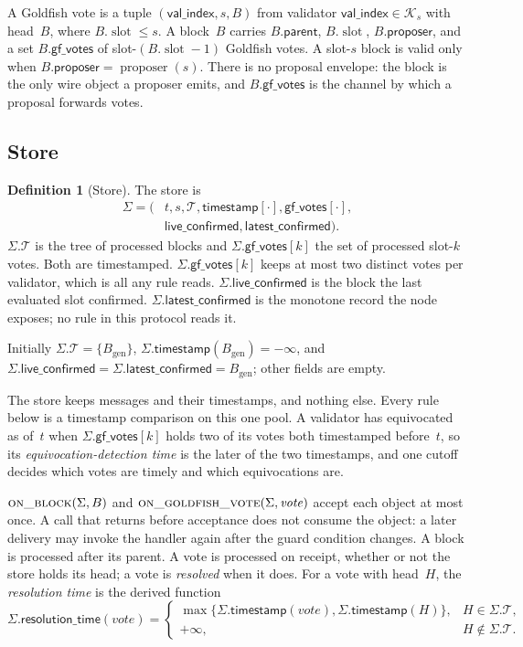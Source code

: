 \documentclass{article}
\theoremstyle{plain}
\theoremstyle{definition}
\newtheorem{definition}{Definition}
\theoremstyle{remark}
\newcommand{\genesis}{B_{\mathrm{gen}}}
\newcommand{\slot}{\operatorname{slot}}
\newcommand{\parent}{\mathsf{parent}}
\newcommand{\proposer}{\mathsf{proposer}}
\newcommand{\valindex}{\mathsf{val\_index}}
\newcommand{\committee}{\mathcal K}
\newcommand{\T}{\mathcal T}
\newcommand{\gfPool}{\mathsf{gf\_votes}}
\newcommand{\liveConfirmed}{\mathsf{live\_confirmed}}
\newcommand{\latestConfirmed}{\mathsf{latest\_confirmed}}
\newcommand{\timestamp}{\mathsf{timestamp}}
\newcommand{\resolutionTime}{\mathsf{resolution\_time}}
\begin{document}
A Goldfish vote is a tuple $(\valindex,s,B)$ from validator
$\valindex\in\committee_s$ with
head~$B$, where $B.\slot\leq s$.  A block~$B$ carries $B.\parent$,
$B.\slot$, $B.\proposer$, and a set $B.\gfPool$ of slot-$(B.\slot-1)$
Goldfish votes.  A slot-$s$ block is valid only when
$B.\proposer=\operatorname{proposer}(s)$.  There is no proposal envelope:
the block is the only wire object a proposer emits, and $B.\gfPool$ is the
channel by which a proposal forwards votes.

\subsection{Store}\label{sec:goldfish-store}

\begin{definition}[Store]\label{def:store}
The store is
\[
\begin{split}
 \Sigma=(&t,s,\T,\timestamp[\cdot],\gfPool[\cdot],\\
  &\liveConfirmed,\latestConfirmed).
\end{split}
\]
$\Sigma.\T$ is the tree of processed blocks and $\Sigma.\gfPool[k]$ the set
of processed slot-$k$ votes.  Both are timestamped.
$\Sigma.\gfPool[k]$ keeps at most two distinct votes per validator, which is
all any rule reads.  $\Sigma.\liveConfirmed$ is the block the last evaluated
slot confirmed. $\Sigma.\latestConfirmed$ is the
monotone record the node exposes; no rule in this protocol reads it.

Initially $\Sigma.\T=\{\genesis\}$,
$\Sigma.\timestamp(\genesis)=-\infty$, and
$\Sigma.\liveConfirmed=\Sigma.\latestConfirmed=\genesis$; other fields are
empty.
\end{definition}

The store keeps messages and their timestamps, and nothing else. Every rule
below is a timestamp comparison on this one pool.  A validator has equivocated
as of~$t$ when $\Sigma.\gfPool[k]$ holds two of its votes both timestamped
before~$t$, so its \emph{equivocation-detection time} is the later of the
two timestamps, and one cutoff decides which votes are timely and which
equivocations are.

$\Call{on\_block}{\Sigma,B}$ and
$\Call{on\_goldfish\_vote}{\Sigma,\mathit{vote}}$
accept each object at most once.  A call that returns before acceptance does
not consume the object: a later delivery may invoke the handler again after
the guard condition changes.  A block is processed after its parent.  A vote is
processed on receipt, whether or not the store holds its head; a vote is
\emph{resolved} when it does.  For a vote with head~$H$, the
\emph{resolution time} is the derived function
\[
 \Sigma.\resolutionTime(\mathit{vote})=
 \begin{cases}
  \max\{\Sigma.\timestamp(\mathit{vote}),\Sigma.\timestamp(H)\},
    & H\in\Sigma.\T,\\
  +\infty, & H\notin\Sigma.\T.
 \end{cases}
\]
\end{document}

